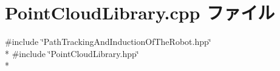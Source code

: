 \section{Point\-Cloud\-Library.\-cpp ファイル}
\label{_point_cloud_library_8cpp}
{\ttfamily \#include \char`\"{}Path\-Tracking\-And\-Induction\-Of\-The\-Robot.\-hpp\char`\"{}}\\*
{\ttfamily \#include \char`\"{}Point\-Cloud\-Library.\-hpp\char`\"{}}\\*
